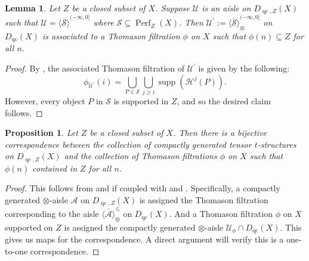\documentclass[11pt]{amsart}
\theoremstyle{plain}
\newtheorem{lemma}[theorem]{Lemma}
\newtheorem{proposition}[theorem]{Proposition}
\theoremstyle{definition}
\numberwithin{equation}{section}
\numberwithin{theorem}{section}
\begin{document}
\begin{lemma}\label{lem:thomason_closed_aisle_lift}
    Let $Z$ be a closed subset of $X$. Suppose $\mathcal{U}$ is an aisle on $D_{\operatorname{qc},Z}(X)$ such that $\mathcal{U} = \overline{ \langle \mathcal{S} \rangle}^{(-\infty,0]}$ where $\mathcal{S}\subseteq \operatorname{Perf}_Z (X)$. Then $\mathcal{U}^\prime:= \overline{ \langle \mathcal{S} \rangle}^{(-\infty,0]}_{\otimes}$ on $D_{\operatorname{qc}}(X)$ is associated to a Thomason filtration $\phi$ on $X$ such that $\phi (n)\subseteq Z$ for all $n$.
\end{lemma}

\begin{proof}
    By \cite[Theorem 3.6]{Lank:2025}, the associated Thomason filtration of $\mathcal{U}^\prime$ is given by the following:
    \begin{displaymath}
        \phi_{\mathcal{U}^\prime} (i)= \bigcup_{P \in \mathcal{S}} \bigcup_{j\geq i} \operatorname{supp}(\mathcal{H}^j (P)).
    \end{displaymath}
    However, every object $P$ in $\mathcal{S}$ is supported in $Z$, and so the desired claim follows.
\end{proof}

\begin{proposition}\label{prop:tensor_t_structures_on_D_Z}
    Let $Z$ be a closed subset of $X$. Then there is a bijective correspondence between the collection of compactly generated tensor $t$-structures on $D_{\operatorname{qc},Z}(X)$ and the collection of Thomason filtrations $\phi$ on $X$  such that $\phi (n)$ contained in $Z$ for all $n$. 
\end{proposition}

\begin{proof}
    This follows from  and  if coupled with \cite[Theorem 3.6]{Lank:2025} and \cite[Example 2.1]{Hrbek/Lank/LeGros/Pavon:2026}. Specifically, a compactly generated $\otimes$-aisle $\mathcal{A}$ on $D_{\operatorname{qc},Z}(X)$ is assigned the Thomason filtration corresponding to the aisle $\overline{ \langle \mathcal{A} \rangle}^{\leq}_{\otimes}$ on $D_{\operatorname{qc}}(X)$. And a Thomason filtration $\phi$ on $X$ supported on $Z$ is assigned the compactly generated $\otimes$-aisle $\mathcal{U}_\phi \cap D_{\operatorname{qc}}(X)$. This gives us maps for the correspondence. A direct argument will verify this is a one-to-one correspondence.
\end{proof}
\end{document}
